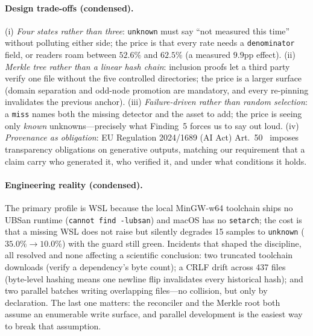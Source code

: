 \paragraph{Design trade-offs (condensed).}
(i) \emph{Four states rather than three}: \texttt{unknown} must say ``not measured this time''
without polluting either side; the price is that every rate needs a \texttt{denominator} field, or
readers roam between $52.6\%$ and $62.5\%$ (a measured $9.9$pp effect). (ii) \emph{Merkle tree
rather than a linear hash chain}: inclusion proofs let a third party verify one file without the
five controlled directories; the price is a larger surface (domain separation and odd-node
promotion are mandatory, and every re-pinning invalidates the previous anchor). (iii)
\emph{Failure-driven rather than random selection}: a \texttt{miss} names both the missing detector
and the asset to add; the price is seeing only \emph{known} unknowns---precisely what Finding~5
forces us to say out loud. (iv) \emph{Provenance as obligation}: EU Regulation 2024/1689 (AI Act)
Art.~50~\cite{eu2024aiact} imposes transparency obligations on generative outputs, matching our
requirement that a claim carry who generated it, who verified it, and under what conditions it
holds.

\paragraph{Engineering reality (condensed).}
The primary profile is WSL because the local MinGW-w64 toolchain ships no UBSan runtime
(\texttt{cannot find -lubsan}) and macOS has no \texttt{setarch}; the cost is that a missing WSL
does not raise but silently degrades 15 samples to \texttt{unknown} ($35.0\%\to10.0\%$) with the
guard still green. Incidents that shaped the discipline, all resolved and none affecting a
scientific conclusion: two truncated toolchain downloads (verify a dependency's byte count); a CRLF
drift across 437 files (byte-level hashing means one newline flip invalidates every historical
hash); and two parallel batches writing overlapping files---no collision, but only by declaration.
The last one matters: the reconciler and the Merkle root both assume an enumerable write surface,
and parallel development is the easiest way to break that assumption.

